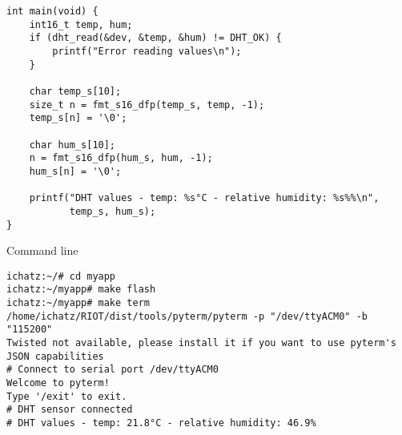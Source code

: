 \documentclass[aspectratio=169]{beamer}
\begin{document}
\begin{frame}[fragile]{}

\begin{exampleblock}{}
\begin{verbatim}
int main(void) {
    int16_t temp, hum;
    if (dht_read(&dev, &temp, &hum) != DHT_OK) {
        printf("Error reading values\n");
    }
    
    char temp_s[10];
    size_t n = fmt_s16_dfp(temp_s, temp, -1);
    temp_s[n] = '\0';
    
    char hum_s[10];
    n = fmt_s16_dfp(hum_s, hum, -1);
    hum_s[n] = '\0';        

    printf("DHT values - temp: %s°C - relative humidity: %s%%\n",
           temp_s, hum_s);
}
\end{verbatim}
\end{exampleblock}
\vspace{2cm}
\end{frame}


\begin{frame}[fragile]{}

\begin{alertblock}{Command line}
\begin{verbatim}
ichatz:~/# cd myapp
ichatz:~/myapp# make flash 
ichatz:~/myapp# make term
/home/ichatz/RIOT/dist/tools/pyterm/pyterm -p "/dev/ttyACM0" -b "115200"  
Twisted not available, please install it if you want to use pyterm's JSON capabilities
# Connect to serial port /dev/ttyACM0
Welcome to pyterm!
Type '/exit' to exit.
# DHT sensor connected
# DHT values - temp: 21.8°C - relative humidity: 46.9%
\end{verbatim}
\end{alertblock}
\vspace{2cm}
\end{frame}
\end{document}
